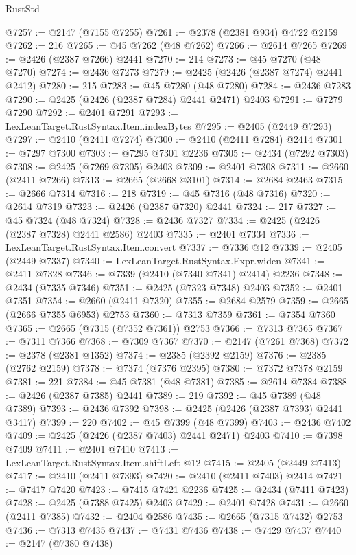 \begin{lexlean}{RustStd}
\begin{coremodule}
@7257 := @2147 (@7155 @7255)
@7261 := @2378 (@2381 @934) @4722 @2159
@7262 := 216
@7265 := @45 @7262 (@48 @7262)
@7266 := @2614 @7265
@7269 := @2426 (@2387 @7266) @2441
@7270 := 214
@7273 := @45 @7270 (@48 @7270)
@7274 := @2436 @7273
@7279 := @2425 (@2426 (@2387 @7274) @2441 @2412)
@7280 := 215
@7283 := @45 @7280 (@48 @7280)
@7284 := @2436 @7283
@7290 := @2425 (@2426 (@2387 @7284) @2441 @2471) @2403
@7291 := @7279 @7290
@7292 := @2401 @7291
@7293 := LexLeanTarget.RustSyntax.Item.indexBytes
@7295 := @2405 (@2449 @7293)
@7297 := @2410 (@2411 @7274)
@7300 := @2410 (@2411 @7284) @2414
@7301 := @7297 @7300
@7303 := @7295 @7301 @2236
@7305 := @2434 (@7292 @7303)
@7308 := @2425 (@7269 @7305) @2403
@7309 := @2401 @7308
@7311 := @2660 (@2411 @7266)
@7313 := @2665 (@2668 @3101)
@7314 := @2684 @2463
@7315 := @2666 @7314
@7316 := 218
@7319 := @45 @7316 (@48 @7316)
@7320 := @2614 @7319
@7323 := @2426 (@2387 @7320) @2441
@7324 := 217
@7327 := @45 @7324 (@48 @7324)
@7328 := @2436 @7327
@7334 := @2425 (@2426 (@2387 @7328) @2441 @2586) @2403
@7335 := @2401 @7334
@7336 := LexLeanTarget.RustSyntax.Item.convert
@7337 := @7336 @12
@7339 := @2405 (@2449 @7337)
@7340 := LexLeanTarget.RustSyntax.Expr.widen
@7341 := @2411 @7328
@7346 := @7339 (@2410 (@7340 @7341) @2414) @2236
@7348 := @2434 (@7335 @7346)
@7351 := @2425 (@7323 @7348) @2403
@7352 := @2401 @7351
@7354 := @2660 (@2411 @7320)
@7355 := @2684 @2579
@7359 := @2665 (@2666 @7355 @6953) @2753
@7360 := @7313 @7359
@7361 := @7354 @7360
@7365 := @2665 (@7315 (@7352 @7361)) @2753
@7366 := @7313 @7365
@7367 := @7311 @7366
@7368 := @7309 @7367
@7370 := @2147 (@7261 @7368)
@7372 := @2378 (@2381 @1352)
@7374 := @2385 (@2392 @2159)
@7376 := @2385 (@2762 @2159)
@7378 := @7374 (@7376 @2395)
@7380 := @7372 @7378 @2159
@7381 := 221
@7384 := @45 @7381 (@48 @7381)
@7385 := @2614 @7384
@7388 := @2426 (@2387 @7385) @2441
@7389 := 219
@7392 := @45 @7389 (@48 @7389)
@7393 := @2436 @7392
@7398 := @2425 (@2426 (@2387 @7393) @2441 @3417)
@7399 := 220
@7402 := @45 @7399 (@48 @7399)
@7403 := @2436 @7402
@7409 := @2425 (@2426 (@2387 @7403) @2441 @2471) @2403
@7410 := @7398 @7409
@7411 := @2401 @7410
@7413 := LexLeanTarget.RustSyntax.Item.shiftLeft @12
@7415 := @2405 (@2449 @7413)
@7417 := @2410 (@2411 @7393)
@7420 := @2410 (@2411 @7403) @2414
@7421 := @7417 @7420
@7423 := @7415 @7421 @2236
@7425 := @2434 (@7411 @7423)
@7428 := @2425 (@7388 @7425) @2403
@7429 := @2401 @7428
@7431 := @2660 (@2411 @7385)
@7432 := @2404 @2586
@7435 := @2665 (@7315 @7432) @2753
@7436 := @7313 @7435
@7437 := @7431 @7436
@7438 := @7429 @7437
@7440 := @2147 (@7380 @7438)

\end{coremodule}
\end{lexlean}
